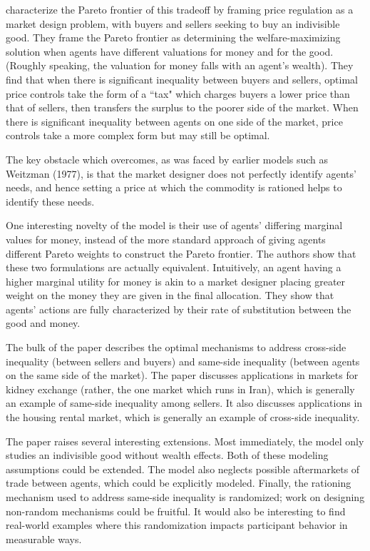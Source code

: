 \documentclass[AER]{AEA}
\begin{document}
\cite{dworczak-2020} characterize the Pareto frontier of this tradeoff by framing price regulation as a market design problem, with buyers and sellers seeking to buy an indivisible good. They frame the Pareto frontier as determining the welfare-maximizing solution when agents have different valuations for money and for the good. (Roughly speaking, the valuation for money falls with an agent's wealth). They find that when there is significant inequality between buyers and sellers, optimal price controls take the form of a ``tax" which charges buyers a lower price than that of sellers, then transfers the surplus to the poorer side of the market. When there is significant inequality between agents on one side of the market, price controls take a more complex form but may still be optimal.

The key obstacle which \cite{dworczak-2020} overcomes, as was faced by earlier models such as Weitzman (1977), is that the market designer does not perfectly identify agents' needs, and hence setting a price at which the commodity is rationed helps to identify these needs.

One interesting novelty of the \cite{dworczak-2020} model is their use of agents' differing marginal values for money, instead of the more standard approach of giving agents different Pareto weights to construct the Pareto frontier. The authors show that these two formulations are actually equivalent. Intuitively, an agent having a higher marginal utility for money is akin to a market designer placing greater weight on the money they are given in the final allocation. They show that agents' actions are fully characterized by their rate of substitution between the good and money.

The bulk of the paper describes the optimal mechanisms to address cross-side inequality (between sellers and buyers) and same-side inequality (between agents on the same side of the market). The paper discusses applications in markets for kidney exchange (rather, the one market which runs in Iran), which is generally an example of same-side inequality among sellers. It also discusses applications in the housing rental market, which is generally an example of cross-side inequality.


The paper raises several interesting extensions. Most immediately, the model only studies an indivisible good without wealth effects. Both of these modeling assumptions could be extended. The model also neglects possible aftermarkets of trade between agents, which could be explicitly modeled. Finally, the rationing mechanism used to address same-side inequality is randomized; work on designing non-random mechanisms could be fruitful. It would also be interesting to find real-world examples where this randomization impacts participant behavior in measurable ways.
\end{document}

